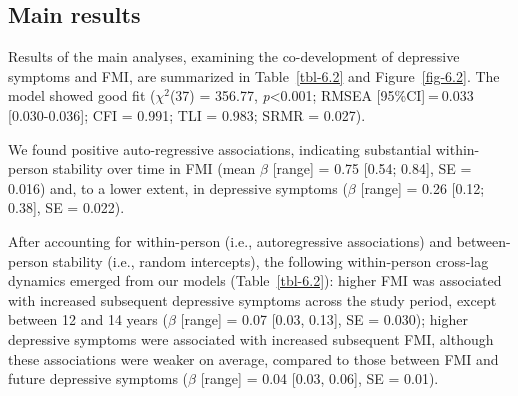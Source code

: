 \documentclass[
  letterpaper,
  DIV=11,
  numbers=noendperiod]{scrreport}
\begin{document}
\subsection{Main results}\label{main-results}

Results of the main analyses, examining the co-development of depressive
symptoms and FMI, are summarized in Table~\ref{tbl-6.2} and
Figure~\ref{fig-6.2}. The model showed good fit (\(χ^2\)(37) = 356.77,
\emph{p}\textless0.001; RMSEA {[}95\%CI{]} = 0.033 {[}0.030-0.036{]};
CFI = 0.991; TLI = 0.983; SRMR = 0.027).

We found positive auto-regressive associations, indicating substantial
within-person stability over time in FMI (mean \(β\) {[}range{]} = 0.75
{[}0.54; 0.84{]}, SE = 0.016) and, to a lower extent, in depressive
symptoms (\(β\) {[}range{]} = 0.26 {[}0.12; 0.38{]}, SE = 0.022).

After accounting for within-person (i.e., autoregressive associations)
and between-person stability (i.e., random intercepts), the following
within-person cross-lag dynamics emerged from our models
(Table~\ref{tbl-6.2}): higher FMI was associated with increased
subsequent depressive symptoms across the study period, except between
12 and 14 years (\(β\) {[}range{]} = 0.07 {[}0.03, 0.13{]}, SE = 0.030);
higher depressive symptoms were associated with increased subsequent
FMI, although these associations were weaker on average, compared to
those between FMI and future depressive symptoms (\(β\) {[}range{]} =
0.04 {[}0.03, 0.06{]}, SE = 0.01).
\end{document}
